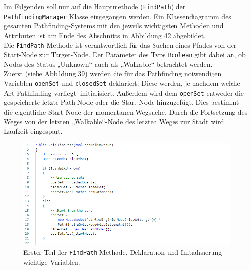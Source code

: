 \documentclass[a4paper,12pt]{article}
\newcommand{\code}{\texttt}
\begin{document}
Im Folgenden soll nur auf die Hauptmethode (\code{FindPath}) der \code{PathfindingManager} Klasse eingegangen werden. Ein Klassendiagramm des gesamten Pathfinding-Systems mit den jeweils wichtigsten Methoden und Attributen ist am Ende des Abschnitts in Abbildung 42 abgebildet.
\\[0.4cm]
Die \code{FindPath} Methode ist verantwortlich für das Suchen eines Pfades von der Start-Node zur Target-Node. Der Parameter des Typs \code{Boolean} gibt dabei an, ob Nodes des Status „Unknown“ auch als „Walkable“ betrachtet werden.
\\[0.4cm]
Zuerst (siehe Abbildung 39) werden die für das Pathfinding notwendigen Variablen \code{openSet} und \code{closedSet} deklariert. Diese werden, je nachdem welche Art Pathfinding vorliegt, initialisiert. Außerdem wird dem \code{openSet} entweder die gespeicherte letzte Path-Node oder die Start-Node hinzugefügt. Dies bestimmt die eigentliche Start-Node der momentanen Wegsuche. Durch die Fortsetzung des Weges von der letzten „Walkable“-Node des letzten Weges zur Stadt wird Laufzeit eingespart.
\begin{figure}[H]
    \centering
    \includegraphics[width=1\linewidth]{Bilder/Aufgabe3/Pathfinding_01.png}
    \caption{Erster Teil der \code{FindPath} Methode. Deklaration und Initialisierung wichtige Variablen.}
\end{figure}
\end{document}
